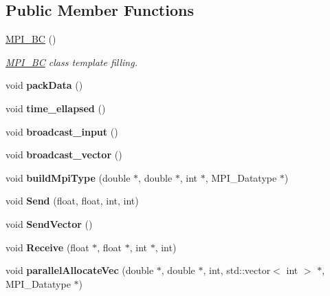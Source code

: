 \subsection*{Public Member Functions}
\begin{DoxyCompactItemize}
\item 
\hyperlink{classMPI__BC_a1c761fcc4df7e6809a0ffd2a20cebd12}{M\+P\+I\+\_\+\+BC} ()
\begin{DoxyCompactList}\small\item\em \hyperlink{classMPI__BC}{M\+P\+I\+\_\+\+BC} class template filling. \end{DoxyCompactList}\item 
\mbox{\label{classMPI__BC_ae489483851e7b20c09ffe112e514f25c}} 
void {\bfseries pack\+Data} ()
\item 
\mbox{\label{classMPI__BC_a833339bd5f16e9d09c1ae15f2870c175}} 
void {\bfseries time\+\_\+ellapsed} ()
\item 
\mbox{\label{classMPI__BC_a336da02d01deace3059d280a5d797d46}} 
void {\bfseries broadcast\+\_\+input} ()
\item 
\mbox{\label{classMPI__BC_a71eb5c66f0072f0c55c8975898eb8edb}} 
void {\bfseries broadcast\+\_\+vector} ()
\item 
\mbox{\label{classMPI__BC_a040c0384ca72ca971eeea94a7e90aa05}} 
void {\bfseries build\+Mpi\+Type} (double $\ast$, double $\ast$, int $\ast$, M\+P\+I\+\_\+\+Datatype $\ast$)
\item 
\mbox{\label{classMPI__BC_a2134566ddece0822a5e3714b3ec13c20}} 
void {\bfseries Send} (float, float, int, int)
\item 
\mbox{\label{classMPI__BC_ada7b741145acc727755fa5dfabbc9575}} 
void {\bfseries Send\+Vector} ()
\item 
\mbox{\label{classMPI__BC_a64ce44132cb41a0cd45ac15601bba6a2}} 
void {\bfseries Receive} (float $\ast$, float $\ast$, int $\ast$, int)
\item 
\mbox{\label{classMPI__BC_a7bfcbf6d2b35ef6894dca53ac4b14af1}} 
void {\bfseries parallel\+Allocate\+Vec} (double $\ast$, double $\ast$, int, std\+::vector$<$ int $>$ $\ast$, M\+P\+I\+\_\+\+Datatype $\ast$)
\end{DoxyCompactItemize}


